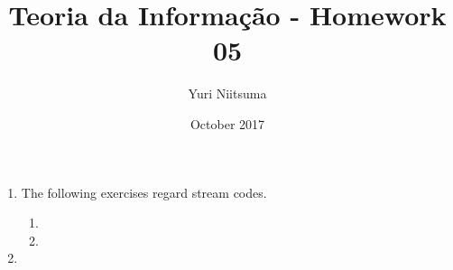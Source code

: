 \documentclass[onecolumn]{IEEEtran}
\title{Teoria da Informação - Homework 05}
\author{Yuri Niitsuma}
\date{October 2017}
\begin{document}
\maketitle

\begin{enumerate}
\itemsep1em

    \section*{Exercises.}
	
	\item
	The following exercises regard stream codes.
	\begin{enumerate}
	    \item
	    
    	\item
    	
	\end{enumerate}
    \bigskip
    
    \newpage
    \item
        

\end{enumerate}
\end{document}
